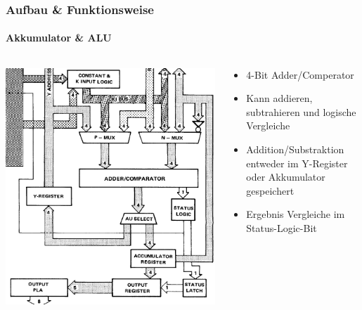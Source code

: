 \begin{frame}
\frametitle{Aufbau \& Funktionsweise}
	\framesubtitle{Akkumulator \& ALU}
		\begin{columns}
			\begin{column}{5cm}
				\includegraphics[scale=0.25]{images/ALU.PNG}
			\end{column}
			\begin{column}{5cm}
				\begin{itemize}
					\item 4-Bit Adder/Comperator \pause
					\item Kann addieren, subtrahieren und logische Vergleiche \pause
					\item Addition/Substraktion entweder im Y-Register oder Akkumulator gespeichert \pause
					\item Ergebnis Vergleiche im Status-Logic-Bit
				\end{itemize}
			\end{column}
		\end{columns}
\end{frame}
	

